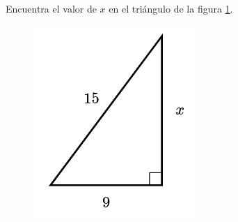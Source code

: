 Encuentra el valor de $x$ en el triángulo de la figura \ref{fig:lados_pitagoras_41}.

\begin{minipage}[t][][t]{0.35\textwidth}
    \begin{figure}[H]
        \centering
        \includegraphics[width=0.9\linewidth]{../images/lados_pitagoras_41.png}
        \caption{}
        \label{fig:lados_pitagoras_41}
    \end{figure}
\end{minipage}\hfill
